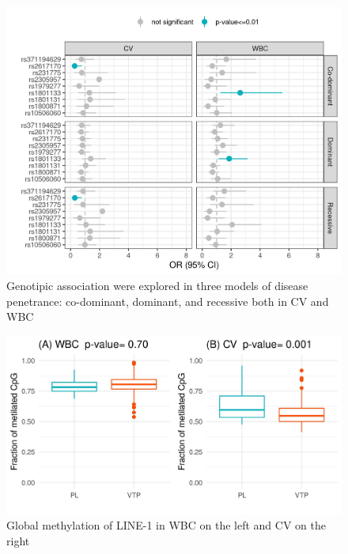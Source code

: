 
\begin{figure}[!ht]
    \centering
    \includegraphics[width=14 cm]{FIGURE/ORgeno.jpg}
    \caption{Genotipic association were explored in three models of disease penetrance: co-dominant, dominant, and recessive both in CV and WBC }
    \label{fig:orgeno}
\end{figure}


\begin{figure}[!ht]
    \centering
    \includegraphics[width=14 cm]{FIGURE/linemet.jpg}
    \caption{Global methylation of LINE-1 in WBC on the left and CV on the right}
    \label{fig:Global methylation}
\end{figure}

